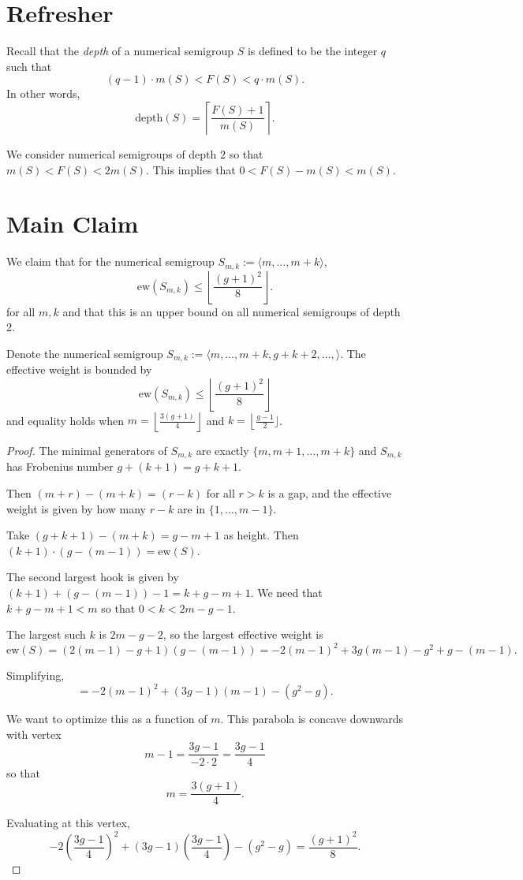 \documentclass[11pt]{article}
\title{}
\author{Erik Imathiu-Jones}
\begin{document}
\maketitle

\section{Refresher}
Recall that the \emph{depth} of a numerical semigroup \(S\) is defined to be the integer \(q\) such that 
\[
(q - 1) \cdot m(S) < F(S) < q \cdot m(S).
\] 
In other words, 
\[
\text{depth}(S) = \left\lceil \frac{F(S) + 1}{m(S)} \right\rceil.
\]

We consider numerical semigroups of depth \(2\) so that \(m(S) < F(S) < 2 m(S)\). This implies that \(0 < F(S) - m(S) < m(S)\).

\section{Main Claim}
We claim that for the numerical semigroup \(S_{m, k} := \langle m, \dots, m + k \rangle\), 
\[
\text{ew}(S_{m, k}) \le \left\lfloor \frac{(g + 1)^2}{8} \right\rfloor.
\]
for all \(m, k\) and that this is an upper bound on all numerical semigroups of depth 2.

\begin{lemma}
Denote the numerical semigroup \(S_{m, k} := \langle m, \dots, m + k, g + k + 2, \dots, \rangle\). The effective weight is bounded by 
\[
\text{ew}(S_{m, k}) \le \left\lfloor \frac{(g + 1)^2}{8} \right\rfloor
\]
and equality holds when \(m = \left\lfloor \frac{3(g + 1)}{4} \right\rfloor\) and \(k = \left\lfloor \frac{g - 1}{2} \rfloor\).
\end{lemma}

\begin{proof}
The minimal generators of \(S_{m, k}\) are exactly \(\{m, m + 1, \dots, m + k\}\) and \(S_{m, k}\) has Frobenius number \(g + (k + 1) = g + k + 1\).

Then \((m + r) - (m + k) = (r - k)\) for all \(r > k\) is a gap, and the effective weight is given by how many \(r - k\) are in \(\{1, \dots, m - 1\}\).

Take \((g + k + 1) - (m + k) = g - m + 1\) as height. Then \((k + 1) \cdot (g - (m - 1)) = \text{ew}(S)\).

The second largest hook is given by \((k + 1) + (g - (m - 1)) - 1 = k + g - m + 1\). We need that \(k + g - m + 1 < m\) so that \(0 < k < 2m - g - 1\).

The largest such \(k\) is \(2m - g - 2\), so the largest effective weight is
\[
\text{ew}(S) = (2(m - 1) - g + 1)(g - (m - 1)) = -2(m-1)^2 + 3g(m - 1) - g^2 + g - (m-1).
\]

Simplifying,
\[
= -2(m-1)^2 + (3g - 1)(m - 1) - (g^2 - g).
\]

We want to optimize this as a function of \(m\). This parabola is concave downwards with vertex
\[
m - 1 = \frac{3g - 1}{-2 \cdot 2} = \frac{3g - 1}{4}
\]
so that 
\[
m = \frac{3(g + 1)}{4}.
\]

Evaluating at this vertex,
\[
-2\left(\frac{3g - 1}{4}\right)^2 + (3g - 1)\left(\frac{3g - 1}{4}\right) - (g^2 - g) = \frac{(g + 1)^2}{8}.
\]
\end{proof}
\end{document}
